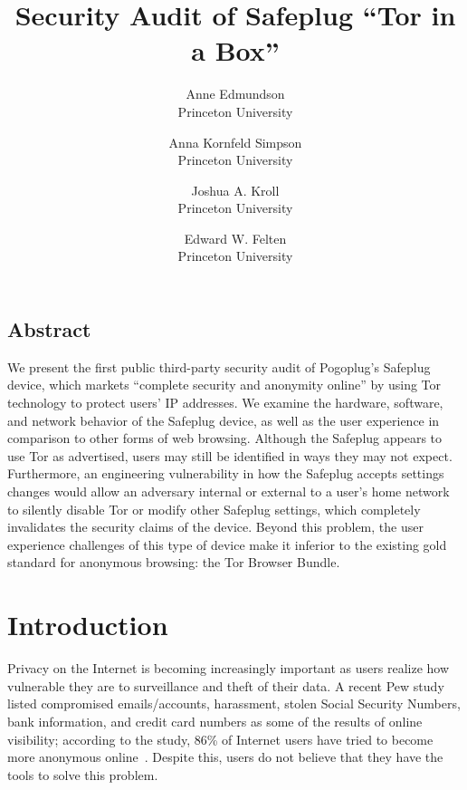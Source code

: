 \documentclass[letterpaper,twocolumn,10pt]{article}
\begin{document}
\date{}

\title{\Large \bf Security Audit of Safeplug ``Tor in a Box''}
\author{
 {\rm Anne Edmundson}\\
 Princeton University
 \and
 {\rm Anna Kornfeld Simpson}\\
 Princeton University
 \and
 {\rm Joshua A. Kroll}\\
 Princeton University
 \and
 {\rm Edward W. Felten}\\
 Princeton University
} %

\maketitle


\subsection*{Abstract}
We present the first public third-party security audit of Pogoplug's Safeplug device, which markets ``complete security and anonymity online'' by using Tor technology to protect users' IP addresses.  We examine the hardware, software, and network behavior of the Safeplug device, as well as the user experience in comparison to other forms of web browsing.  Although the Safeplug appears to use Tor as advertised, users may still be identified in ways they may not expect.  Furthermore, an engineering vulnerability in how the Safeplug accepts settings changes would allow an adversary internal or external to a user's home network to silently disable Tor or modify other Safeplug settings, which completely invalidates the security claims of the device.  Beyond this problem, the user experience challenges of this type of device make it inferior to the existing gold standard for anonymous browsing: the Tor Browser Bundle.


\section{Introduction}
Privacy on the Internet is becoming increasingly important as users realize how vulnerable they are to surveillance and theft of their data.  A recent Pew study listed compromised emails/accounts, harassment, stolen Social Security Numbers, bank information, and credit card numbers as some of the results of online visibility; according to the study, 86\% of Internet users have tried to become more anonymous online~\cite{pew}.  Despite this, users do not believe that they have the tools to solve this problem.
\end{document}
